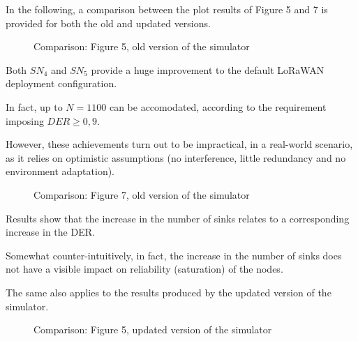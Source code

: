 \documentclass[a4paper,11pt]{article} %
\begin{document}
    In the following, a comparison between the plot results of Figure 5 and 7 is provided for both the old and updated versions.

    \begin{figure}[H]
        \centering
        \qquad
        \caption{Comparison: Figure 5, old version of the simulator}
        \label{fig:comparison-f5-old}
    \end{figure}

    Both $SN_4$ and $SN_5$ provide a huge improvement to the default LoRaWAN deployment configuration.

    \smallskip

    In fact, up to $N = 1100$ can be accomodated, according to the requirement imposing $DER \geq 0,9$.

    \smallskip

    However, these achievements turn out to be impractical, in a real-world scenario, as it relies on optimistic assumptions (no interference, little redundancy and no environment adaptation).

    \begin{figure}[H]
        \centering
        \qquad
        \caption{Comparison: Figure 7, old version of the simulator}
        \label{fig:comparison-f7-old}
    \end{figure}

    Results show that the increase in the number of sinks relates to a corresponding increase in the \textsc{DER}.

    \smallskip

    Somewhat counter-intuitively, in fact, the increase in the number of sinks does not have a visible impact on reliability (saturation) of the nodes.

    \smallskip

    The same also applies to the results produced by the updated version of the simulator.

    \begin{figure}[H]
        \centering
        \qquad
        \caption{Comparison: Figure 5, updated version of the simulator}
        \label{fig:comparison-f5-updated}
    \end{figure}
\end{document}
